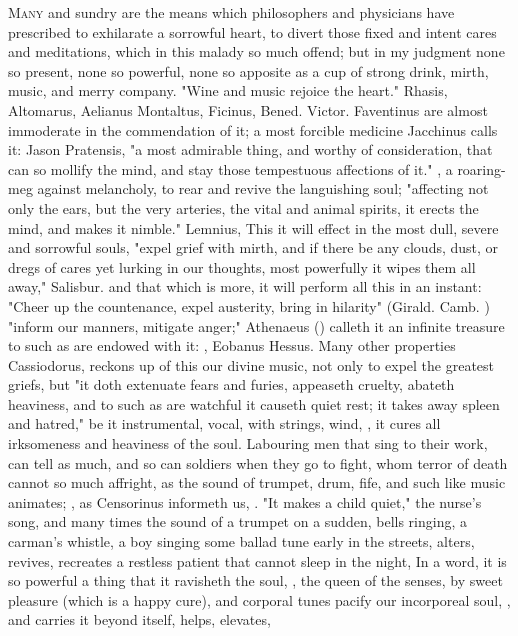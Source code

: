 {\lettrine{M}{any} and sundry are the means which philosophers and physicians have prescribed to exhilarate a sorrowful heart, to divert those fixed and intent cares and meditations, which in this malady so much offend; but in my judgment none so present, none so powerful, none so apposite as a cup of strong drink, mirth, music, and merry company.  "Wine and music rejoice the heart." Rhasis,  Altomarus,  Aelianus Montaltus,  Ficinus, Bened. Victor. Faventinus are almost immoderate in the commendation of it; a most forcible medicine Jacchinus calls it: Jason Pratensis, "a most admirable thing, and worthy of consideration, that can so mollify the mind, and stay those tempestuous affections of it." , a roaring-meg against melancholy, to rear and revive the languishing soul; "affecting not only the ears, but the very arteries, the vital and animal spirits, it erects the mind, and makes it nimble." Lemnius,  This it will effect in the most dull, severe and sorrowful souls, "expel grief with mirth, and if there be any clouds, dust, or dregs of cares yet lurking in our thoughts, most powerfully it wipes them all away," Salisbur.  and that which is more, it will perform all this in an instant: "Cheer up the countenance, expel austerity, bring in hilarity" (Girald. Camb. ) "inform our manners, mitigate anger;" Athenaeus () calleth it an infinite treasure to such as are endowed with it: , Eobanus Hessus. Many other properties Cassiodorus,  reckons up of this our divine music, not only to expel the greatest griefs, but "it doth extenuate fears and furies, appeaseth cruelty, abateth heaviness, and to such as are watchful it causeth quiet rest; it takes away spleen and hatred," be it instrumental, vocal, with strings, wind, , \etc{} it cures all irksomeness and heaviness of the soul. Labouring men that sing to their work, can tell as much, and so can soldiers when they go to fight, whom terror of death cannot so much affright, as the sound of trumpet, drum, fife, and such like music animates; , as Censorinus informeth us, . "It makes a child quiet," the nurse's song, and many times the sound of a trumpet on a sudden, bells ringing, a carman's whistle, a boy singing some ballad tune early in the streets, alters, revives, recreates a restless patient that cannot sleep in the night, \etc{} In a word, it is so powerful a thing that it ravisheth the soul, , the queen of the senses, by sweet pleasure (which is a happy cure), and corporal tunes pacify our incorporeal soul, , and carries it beyond itself, helps, elevates, }
